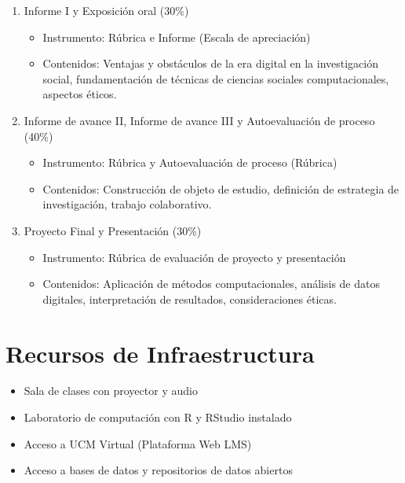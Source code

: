 \documentclass[11pt,letter,]{article}
\providecommand{\tightlist}{%
  \setlength{\itemsep}{0pt}\setlength{\parskip}{0pt}}
\begin{document}
\begin{enumerate}
\def\labelenumi{\arabic{enumi}.}
\tightlist
\item
  Informe I y Exposición oral (30\%)

  \begin{itemize}
  \tightlist
  \item
    Instrumento: Rúbrica e Informe (Escala de apreciación)
  \item
    Contenidos: Ventajas y obstáculos de la era digital en la
    investigación social, fundamentación de técnicas de ciencias
    sociales computacionales, aspectos éticos.
  \end{itemize}
\item
  Informe de avance II, Informe de avance III y Autoevaluación de
  proceso (40\%)

  \begin{itemize}
  \tightlist
  \item
    Instrumento: Rúbrica y Autoevaluación de proceso (Rúbrica)
  \item
    Contenidos: Construcción de objeto de estudio, definición de
    estrategia de investigación, trabajo colaborativo.
  \end{itemize}
\item
  Proyecto Final y Presentación (30\%)

  \begin{itemize}
  \tightlist
  \item
    Instrumento: Rúbrica de evaluación de proyecto y presentación
  \item
    Contenidos: Aplicación de métodos computacionales, análisis de datos
    digitales, interpretación de resultados, consideraciones éticas.
  \end{itemize}
\end{enumerate}

\hypertarget{recursos-de-infraestructura}{%
\section{Recursos de
Infraestructura}\label{recursos-de-infraestructura}}

\begin{itemize}
\tightlist
\item
  Sala de clases con proyector y audio
\item
  Laboratorio de computación con R y RStudio instalado
\item
  Acceso a UCM Virtual (Plataforma Web LMS)
\item
  Acceso a bases de datos y repositorios de datos abiertos
\end{itemize}
\end{document}
